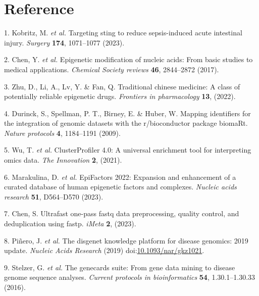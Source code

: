 \documentclass[
]{article}
\newenvironment{cslreferences}%
  {}%
  {\par}
\begin{document}
\hypertarget{bibliography}{%
\section*{Reference}\label{bibliography}}

\hypertarget{refs}{}
\begin{cslreferences}
\leavevmode\hypertarget{ref-TargetingStingKobrit2023}{}%
1. Kobritz, M. \emph{et al.} Targeting sting to reduce sepsis-induced acute intestinal injury. \emph{Surgery} \textbf{174}, 1071--1077 (2023).

\leavevmode\hypertarget{ref-EpigeneticModiChen2017}{}%
2. Chen, Y. \emph{et al.} Epigenetic modification of nucleic acids: From basic studies to medical applications. \emph{Chemical Society reviews} \textbf{46}, 2844--2872 (2017).

\leavevmode\hypertarget{ref-TraditionalChiZhuD2022}{}%
3. Zhu, D., Li, A., Lv, Y. \& Fan, Q. Traditional chinese medicine: A class of potentially reliable epigenetic drugs. \emph{Frontiers in pharmacology} \textbf{13}, (2022).

\leavevmode\hypertarget{ref-MappingIdentifDurinc2009}{}%
4. Durinck, S., Spellman, P. T., Birney, E. \& Huber, W. Mapping identifiers for the integration of genomic datasets with the r/bioconductor package biomaRt. \emph{Nature protocols} \textbf{4}, 1184--1191 (2009).

\leavevmode\hypertarget{ref-ClusterprofilerWuTi2021}{}%
5. Wu, T. \emph{et al.} ClusterProfiler 4.0: A universal enrichment tool for interpreting omics data. \emph{The Innovation} \textbf{2}, (2021).

\leavevmode\hypertarget{ref-Epifactors2022Maraku2023}{}%
6. Marakulina, D. \emph{et al.} EpiFactors 2022: Expansion and enhancement of a curated database of human epigenetic factors and complexes. \emph{Nucleic acids research} \textbf{51}, D564--D570 (2023).

\leavevmode\hypertarget{ref-UltrafastOnePChen2023}{}%
7. Chen, S. Ultrafast one-pass fastq data preprocessing, quality control, and deduplication using fastp. \emph{iMeta} \textbf{2}, (2023).

\leavevmode\hypertarget{ref-TheDisgenetKnPinero2019}{}%
8. Piñero, J. \emph{et al.} The disgenet knowledge platform for disease genomics: 2019 update. \emph{Nucleic Acids Research} (2019) doi:\href{https://doi.org/10.1093/nar/gkz1021}{10.1093/nar/gkz1021}.

\leavevmode\hypertarget{ref-TheGenecardsSStelze2016}{}%
9. Stelzer, G. \emph{et al.} The genecards suite: From gene data mining to disease genome sequence analyses. \emph{Current protocols in bioinformatics} \textbf{54}, 1.30.1--1.30.33 (2016).


\end{cslreferences}
\end{document}

